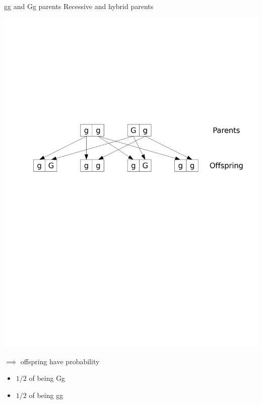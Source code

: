 \documentclass[aspectratio=169]{beamer}
\begin{document}
\begin{frame}{gg and Gg parents}
Recessive and hybrid parents
\vfill
\begin{center}
	\includegraphics[width=\textwidth]{FIGS_slides/recessive_hybrid}
\end{center}
\vfill
$\implies$ offspring have probability 
\begin{itemize}
\item $1/2$ of being Gg 
\item $1/2$ of being gg
\end{itemize}
\end{frame}




\end{document}
